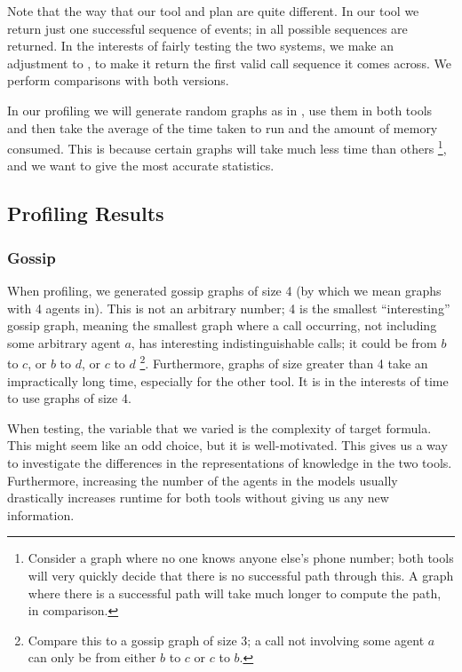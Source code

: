 \documentclass[10pt, a4paper]{report}
\begin{document}
Note that the way that our tool and \cite{GithubGossip} plan are quite
different. In our tool we return just one successful sequence of events; in
\cite{GithubGossip} all possible sequences are returned. In the interests of
fairly testing the two systems, we make an adjustment to \cite{GithubGossip}, to
make it return the first valid call sequence it comes across. We perform
comparisons with both versions.

In our profiling we will generate random graphs as in
, use them in both tools and then take the average
of the time taken to run and the amount of memory consumed. This is because
certain graphs will take much less time than others \footnote{Consider a graph
  where no one knows anyone else's phone number; both tools will very quickly
  decide that there is no successful path through this. A graph where there is a
  successful path will take much longer to compute the path, in comparison.},
and we want to give the most accurate statistics.

\subsection{Profiling Results}

\subsubsection{Gossip}

When profiling, we generated gossip graphs of size 4 (by which we mean graphs
with 4 agents in). This is not an arbitrary number; 4 is the smallest
``interesting'' gossip graph, meaning the smallest graph where a call occurring,
not including some arbitrary agent $a$, has interesting indistinguishable calls;
it could be from $b$ to $c$, or $b$ to $d$, or $c$ to $d$ \footnote{Compare this
  to a gossip graph of size 3; a call not involving some agent $a$ can only be
  from either $b$ to $c$ or $c$ to $b$.}. Furthermore, graphs of size greater
than 4 take an impractically long time, especially for the other tool. It is in
the interests of time to use graphs of size 4.

When testing, the variable that we varied is the complexity of target formula.
This might seem like an odd choice, but it is well-motivated. This gives us
a way to investigate the differences in the representations of knowledge in the
two tools. Furthermore, increasing the number of the agents in the models
usually drastically increases runtime for both tools without giving us any new
information.
\end{document}
